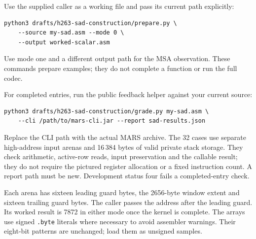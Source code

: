 Use the supplied caller as a working file and pass its current path explicitly:
\begin{verbatim}
python3 drafts/h263-sad-construction/prepare.py \
    --source my-sad.asm --mode 0 \
    --output worked-scalar.asm
\end{verbatim}
Use mode one and a different output path for the MSA observation. These commands
prepare examples; they do not complete a function or run the full codec.

For completed entries, run the public feedback helper against your current source:
\begin{verbatim}
python3 drafts/h263-sad-construction/grade.py my-sad.asm \
    --cli /path/to/mars-cli.jar --report sad-results.json
\end{verbatim}
Replace the CLI path with the actual MARS archive. The 32 cases use separate
high-address input arenas and 16\,384 bytes of valid private stack storage. They
check arithmetic, active-row reads, input preservation and the callable result;
they do not require the pictured register allocation or a fixed instruction count.
A report path must be new. Development status four fails a completed-entry check.

Each arena has sixteen leading guard bytes, the 2656-byte window extent and
sixteen trailing guard bytes. The caller passes the address after the leading
guard. Its worked result is 7872 in either mode once the kernel is complete.
The arrays use signed \texttt{.byte} literals where necessary to avoid assembler
warnings. Their eight-bit patterns are unchanged; load them as unsigned samples.
